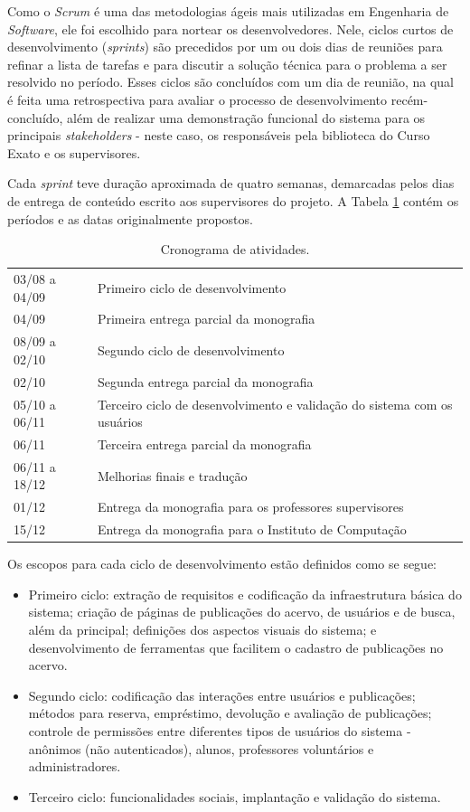 \documentclass[a4paper]{article}
\begin{document}
Como o \textit{Scrum} \cite{scrum} é uma das metodologias ágeis mais utilizadas em Engenharia de \textit{Software}, ele foi escolhido para nortear os desenvolvedores. Nele, ciclos curtos de desenvolvimento (\textit{sprints}) são precedidos por um ou dois dias de reuniões para refinar a lista de tarefas e para discutir a solução técnica para o problema a ser resolvido no período. Esses ciclos são concluídos com um dia de reunião, na qual é feita uma retrospectiva para avaliar o processo de desenvolvimento recém-concluído, além de realizar uma demonstração funcional do sistema para os principais \textit{stakeholders} - neste caso, os responsáveis pela biblioteca do Curso Exato e os supervisores.

Cada \textit{sprint} teve duração aproximada de quatro semanas, demarcadas pelos dias de entrega de conteúdo escrito aos supervisores do projeto. A Tabela \ref{cronograma} contém os períodos e as datas originalmente propostos.

\begin{table}[hc]
\centering
\caption{Cronograma de atividades.\label{cronograma}}
\begin{tabular}{ll}
\hline
03/08 a 04/09 & Primeiro ciclo de desenvolvimento \\
04/09 & Primeira entrega parcial da monografia \\
08/09 a 02/10 & Segundo ciclo de desenvolvimento \\
02/10 & Segunda entrega parcial da monografia \\
05/10 a 06/11 & Terceiro ciclo de desenvolvimento e validação do sistema com os usuários \\
06/11 & Terceira entrega parcial da monografia \\
06/11 a 18/12 & Melhorias finais e tradução\\
01/12 & Entrega da monografia para os professores supervisores\\
15/12 & Entrega da monografia para o Instituto de Computação\\
\hline
\end{tabular}
\end{table}

Os escopos para cada ciclo de desenvolvimento estão definidos como se segue:

\begin{itemize}
\item Primeiro ciclo: extração de requisitos e codificação da infraestrutura básica do sistema; criação de páginas de publicações do acervo, de usuários e de busca, além da principal; definições dos aspectos visuais do sistema; e desenvolvimento de ferramentas que facilitem o cadastro de publicações no acervo.
\item Segundo ciclo: codificação das interações entre usuários e publicações; métodos para reserva, empréstimo, devolução e avaliação de publicações; controle de permissões entre diferentes tipos de usuários do sistema - anônimos (não autenticados), alunos, professores voluntários e administradores.
\item Terceiro ciclo: funcionalidades sociais, implantação e validação do sistema.
\end{itemize}
\end{document}
